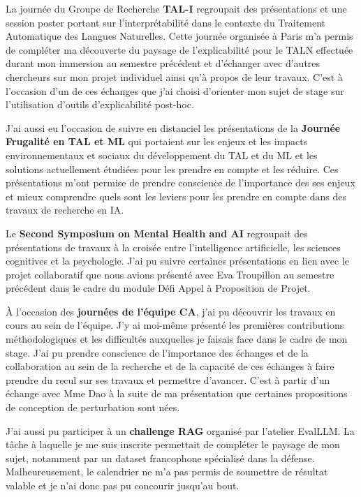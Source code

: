     La journée du Groupe de Recherche \textbf{TAL-I} regroupait des présentations et une session poster portant sur l'interprétabilité dans le contexte du Traitement Automatique des Langues Naturelles. Cette journée organisée à Paris m'a permis de compléter ma découverte du paysage de l'explicabilité pour le TALN  effectuée durant mon immersion au semestre précédent et d'échanger avec d'autres chercheurs sur mon projet individuel ainsi qu'à propos de leur travaux. C'est à l'occasion d'un de ces échanges que j'ai choisi d'orienter mon sujet de stage sur l'utilisation d'outils d'explicabilité post-hoc.

    J'ai aussi eu l'occasion de suivre en distanciel les présentations de la \textbf{Journée Frugalité en TAL et ML} qui portaient sur les enjeux et les impacts environnementaux et sociaux du développement du TAL et du ML et les solutions actuellement étudiées pour les prendre en compte et les réduire. Ces présentations m'ont permise de prendre conscience de l'importance des ses enjeux et mieux comprendre quels sont les leviers pour les prendre en compte dans des travaux de recherche en IA.

    Le \textbf{Second Symposium on Mental Health and AI} regroupait des présentations de travaux à la croisée entre l'intelligence artificielle, les sciences cognitives et la psychologie. J'ai pu suivre certaines présentations en lien avec le projet collaboratif que nous avions présenté avec Eva Troupillon au semestre précédent dans le cadre du module Défi Appel à Proposition de Projet. 

    À l'occasion des \textbf{journées de l'équipe CA}, j'ai pu découvrir les travaux en  cours au sein de l'équipe. J'y ai moi-même présenté les premières contributions méthodologiques et les difficultés auxquelles je faisais face dans le cadre de mon stage. J'ai pu prendre conscience de l'importance des échanges et de la collaboration au sein de la recherche et de la capacité de ces échanges à faire prendre du recul sur ses travaux et permettre d'avancer. C'est à partir d'un échange avec Mme Dao à la suite de ma présentation que certaines propositions de conception de perturbation sont nées.

    J'ai aussi pu participer à un \textbf{challenge RAG} organisé par l'atelier EvalLLM. La tâche à laquelle je me suis inscrite permettait de compléter le paysage de mon sujet, notamment par un dataset francophone spécialisé dans la défense. Malheureusement, le calendrier ne m'a pas permis de soumettre de résultat valable et je n'ai donc pas pu concourir jusqu'au bout.
    
